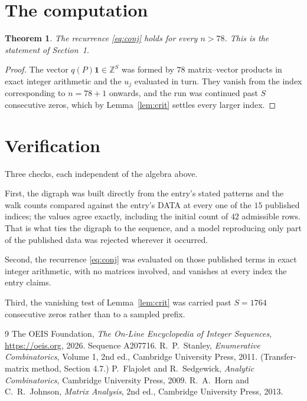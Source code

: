 \documentclass[11pt,a4paper]{article}
\theoremstyle{plain}
\newtheorem{theorem}{Theorem}
\theoremstyle{definition}
\begin{document}
\section{The computation}

\begin{theorem}
The recurrence \eqref{eq:conj} holds for every $n>78$. This is the statement of
Section~1.
\end{theorem}

\begin{proof}
The vector $q(P)\mathbf{1}\in\mathbb{Z}^{S}$ was formed by $78$ matrix--vector
products in exact integer arithmetic and the $u_j$ evaluated in turn. They vanish from the
index corresponding to $n=78+1$ onwards, and the run was continued past $S$ consecutive
zeros, which by Lemma~\ref{lem:crit} settles every larger index.
\end{proof}

\section{Verification}

Three checks, each independent of the algebra above.

First, the digraph was built directly from the entry's stated patterns and the walk counts
compared against the entry's DATA at every one of the $15$ published indices; the
values agree exactly, including the initial count of $42$ admissible rows. That is
what ties the digraph to the sequence, and a model reproducing only part of the published
data was rejected wherever it occurred.

Second, the recurrence \eqref{eq:conj} was evaluated on those published terms in exact
integer arithmetic, with no matrices involved, and vanishes at every index the entry claims.

Third, the vanishing test of Lemma~\ref{lem:crit} was carried past $S=1764$ consecutive
zeros rather than to a sampled prefix.

\begin{thebibliography}{9}
 The OEIS Foundation, \emph{The On-Line Encyclopedia of Integer
Sequences}, \url{https://oeis.org}, 2026. Sequence A207716.
 R.~P.~Stanley, \emph{Enumerative Combinatorics}, Volume 1, 2nd ed.,
Cambridge University Press, 2011. (Transfer-matrix method, Section 4.7.)
 P.~Flajolet and R.~Sedgewick, \emph{Analytic Combinatorics}, Cambridge
University Press, 2009.
 R.~A.~Horn and C.~R.~Johnson, \emph{Matrix Analysis}, 2nd ed., Cambridge
University Press, 2013.
\end{thebibliography}
\end{document}
